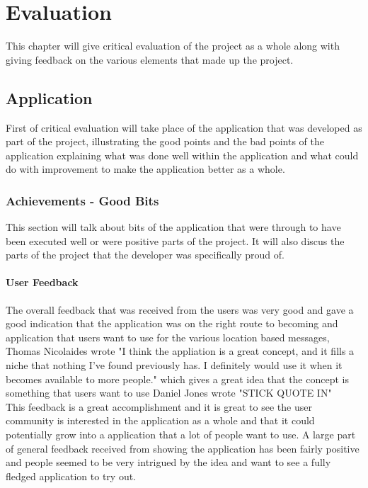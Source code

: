 \chapter{Evaluation}

This chapter will give critical evaluation of the project as a whole along with giving feedback on the various elements that made up the project.

\section{Application}

First of critical evaluation will take place of the application that was developed as part of the project, illustrating the good points and the bad points of the application explaining what was done well within the application and what could do with improvement to make the application better as a whole.

\subsection{Achievements - Good Bits}

This section will talk about bits of the application that were through to have been executed well or were positive parts of the project. It will also discus the parts of the project that the developer was specifically proud of.

\subsubsection{User Feedback}

The overall feedback that was received from the users was very good and gave a good indication that the application was on the right route to becoming and application that users want to use for the various location based messages, Thomas Nicolaides wrote "I think the appliation is a great concept, and it fills a niche that nothing I've found previously has. I definitely would use it when it becomes available to more people." which gives a great idea that the concept is something that users want to use Daniel Jones wrote "{STICK QUOTE IN}" 
\\
This feedback is a great accomplishment and it is great to see the user community is interested in the application as a whole and that it could potentially grow into a application that a lot of people want to use. A large part of general feedback received from showing the application has been fairly positive and people seemed to be very intrigued by the idea and want to see a fully fledged application to try out.


